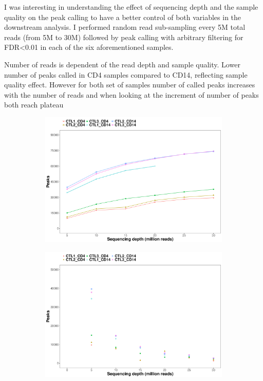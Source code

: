 I was interesting in understanding the effect of sequencing depth and the sample quality on the peak calling to have a better control of both variables in the downstream analysis. I performed random read sub-sampling every 5M total reads (from 5M to 30M) followed by peak calling with arbitrary filtering for FDR<0.01 in each of the six aforementioned samples. 

Number of reads is dependent of the read depth and sample quality. Lower number of peaks called in CD4 samples compared to CD14, reflecting sample quality effect. However for both set of samples number of called peaks increases with the number of reads and when looking at the increment of number of peaks both reach plateau


\begin{figure}[htbp]
\centering
\begin{subfigure}{0.5\textwidth}
\centering
\includegraphics[width=\textwidth]{./Results1/pdfs/ATAC_Core_fresh_CD4_CD14_num_peaks_vs_depth}
\caption{\textbf{}}
\end{subfigure}%
\begin{subfigure}{0.5\textwidth}
\centering
\includegraphics[width=\textwidth]{./Results1/pdfs/ATAC_Core_fresh_CD4_CD14_increment_num_peaks_vs_depth}

\end{subfigure}
\end{figure}
